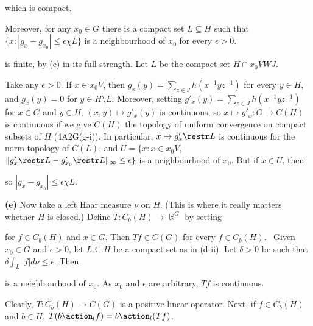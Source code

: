 {\noindent which is compact.\ \Qed

\medskip

 Moreover, for any $x_0\in G$ there is a compact set
$L\subseteq H$ such that
$\{x:|g_x-g_{x_0}|\le\epsilon\chi L\}$ is a neighbourhood of $x_0$ for
every $\epsilon>0$.   \Prf\


\noindent is finite, by (c) in its full strength.   Let $L$ be the compact
set $H\cap x_0VWJ$.

Take any $\epsilon>0$.   If $x\in x_0V$, then
$g_x(y)=\sum_{z\in J}h(x^{-1}yz^{-1})$ for every $y\in H$, and
$g_x(y)=0$ for $y\in H\setminus L$.   Moreover, setting
$g'_x(y)=\sum_{z\in J}h(x^{-1}yz^{-1})$ for $x\in G$ and $y\in H$,
$(x,y)\mapsto g'_x(y)$ is continuous, so $x\mapsto g'_x:G\to C(H)$ is
continuous if we give $C(H)$ the topology of uniform convergence on compact
subsets of $H$ (4A2G(g-i)).   In particular, $x\mapsto g'_x\restr L$ is
continuous for the norm topology of $C(L)$, and
$U
=\{x:x\in x_0V$, $\|g'_x\restr L-g'_{x_0}\restr L\|_{\infty}\le\epsilon\}$
is a neighbourhood of $x_0$.   But if $x\in U$, then



\noindent so $|g_x-g_{x_0}|\le\epsilon\chi L$.\ \Qed

\medskip

{\bf (e)} Now take a left Haar measure $\nu$ on $H$.   (This is where it
really matters whether $H$ is closed.)   Define $T:C_b(H)\to\BbbR^G$ by
setting


\noindent for $f\in C_b(H)$ and $x\in G$.   Then $Tf\in C(G)$ for every
$f\in C_b(H)$.   \Prf\ Given $x_0\in G$ and $\epsilon>0$, let
$L\subseteq H$ be a compact set as in (d-ii).   Let $\delta>0$ be such that
$\delta\int_L|f|d\nu\le\epsilon$.   Then


\noindent is a neighbourhood of $x_0$.   As $x_0$ and $\epsilon$ are
arbitrary, $Tf$ is continuous.\ \Qed

Clearly, $T:C_b(H)\to C(G)$ is a positive linear operator.   Next, if
$f\in C_b(H)$ and $b\in H$, $T(b\action_lf)=b\action_l(Tf)$.    \Prf\

}
